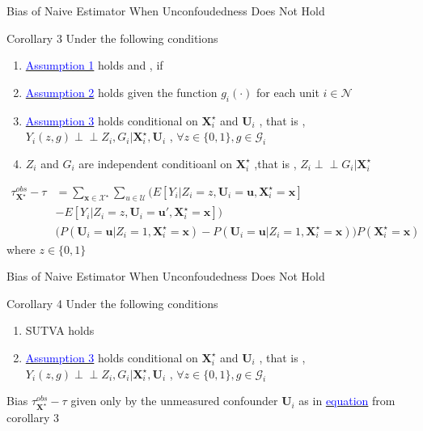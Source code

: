 \documentclass[notes,11pt, aspectratio=169]{beamer}
\begin{document}
\begin{frame}{Bias of Naive Estimator When Unconfoudedness Does Not Hold}
\begin{block}{Corollary 3}
Under the following conditions
\begin{enumerate}
    \item \hyperlink{assump1}{\textcolor{blue}{Assumption 1}} holds and  , if  
    \item \hyperlink{assump2}{\textcolor{blue}{Assumption 2}} holds given the function $g_i(\cdot)$ for each unit $i \in \mathcal{N}$
    \item \hyperlink{assump3}{\textcolor{blue}{Assumption 3}} holds conditional on $\mathbf{X}_{i}^\star$ and $\mathbf{U}_i$ , that is , $Y_i(z,g) \perp\!\!\!\perp Z_i,G_i|\mathbf{X}_{i}^\star , \mathbf{U}_i$ , $\forall z \in \{0,1\} , g \in \mathcal{G}_i$
    \item $Z_i$ and $G_i$ are independent conditioanl on $\mathbf{X}_{i}^\star$ ,that is , $Z_i \perp\!\!\!\perp G_i|\mathbf{X}_{i}^\star$ 
\end{enumerate}
%
\begin{align*}\label{equa14}
   \tau_{\mathbf{X}^\star}^{obs}-\tau & = \sum_{\mathbf{x} \in \mathcal{X}^\star} \sum_{u \in \mathcal{U}} \Big( E[Y_i|Z_i=z ,  \mathbf{U}_i = \mathbf{u} , \mathbf{X}_{i}^\star = \mathbf{x}] 
\\ & - E[Y_i|Z_i= z ,  \mathbf{U}_i = \mathbf{u}' , \mathbf{X}_{i}^\star = \mathbf{x}] \Big)
\\ & \Big( P( \mathbf{U}_i = \mathbf{u} | Z_i=1 , \mathbf{X}_{i}^\star = \mathbf{x}) -  P( \mathbf{U}_i = \mathbf{u} | Z_i=1 , \mathbf{X}_{i}^\star = \mathbf{x}) \Big)P(\mathbf{X}_{i}^\star = \mathbf{x})
\end{align*}
where $z \in \{0,1\}$
\end{block}
\end{frame}


\begin{frame}{Bias of Naive Estimator When Unconfoudedness Does Not Hold}
\begin{block}{Corollary 4}
Under the following conditions
\begin{enumerate}
    \item SUTVA holds 
    \item \hyperlink{assump3}{\textcolor{blue}{Assumption 3}} holds conditional on $\mathbf{X}_{i}^\star$ and $\mathbf{U}_i$ , that is , $Y_i(z,g) \perp\!\!\!\perp Z_i,G_i|\mathbf{X}_{i}^\star , \mathbf{U}_i$ , $\forall z \in \{0,1\} , g \in \mathcal{G}_i$
\end{enumerate}
%
\vspace{1em}
Bias $ \tau_{\mathbf{X}^\star}^{obs}-\tau $ given only by the unmeasured confounder $\mathbf{U}_i$ as in \hyperlink{equa14}{\textcolor{blue}{equation}} from corollary 3
%
\end{block}
\end{frame}
\end{document}

